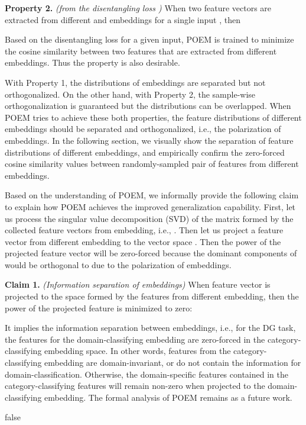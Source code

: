 \documentclass[letterpaper]{article} \usepackage{aaai23}  \usepackage{times}  \usepackage{helvet}  \usepackage{courier}  \usepackage[hyphens]{url}  \usepackage{graphicx} \urlstyle{rm} \def\UrlFont{\rm}  \usepackage{natbib}  \usepackage{caption} \frenchspacing  \setlength{\pdfpagewidth}{8.5in}  \setlength{\pdfpageheight}{11in}  \usepackage[labelsep=period]{caption}
\begin{document}
\textbf{Property 2.} \textit{(from the disentangling loss )} When two feature vectors are extracted from different   and  embeddings for a single input , then


Based on the disentangling loss for a given input, POEM is trained to minimize the cosine similarity between two features that are extracted from different embeddings. Thus the property is also desirable. 

With Property 1, the distributions of embeddings are separated but not orthogonalized. On the other hand, with Property 2, the sample-wise orthogonalization is guaranteed but the distributions can be overlapped.
When POEM tries to achieve these both properties, the feature distributions of different embeddings should be separated and orthogonalized, i.e., the polarization of embeddings.
In the following section, we visually show the separation of feature distributions of different embeddings, and empirically confirm the zero-forced cosine similarity values between randomly-sampled pair of features from different embeddings. 

Based on the understanding of POEM, we informally provide the following claim to explain how POEM achieves the improved generalization capability. 
First, let us process the singular value decomposition (SVD) of the matrix  formed by the collected feature vectors from  embedding, i.e., . Then let us project a feature vector  from different  embedding to the vector space .
Then the power of the projected feature vector will be zero-forced because the dominant components of  would be orthogonal to  due to the polarization of embeddings.

\textbf{Claim 1.} \textit{(Information separation of embeddings)} When feature vector  is projected to the space formed by the features from different  embedding, then the power of the projected feature is minimized to zero:


It implies the information separation between embeddings, i.e., for the DG task, the features for the domain-classifying embedding are zero-forced in the category-classifying embedding space.
In other words,  features from the category-classifying embedding are domain-invariant, or do not contain the information for domain-classification. Otherwise, the domain-specific features contained in the category-classifying features will remain non-zero when projected to the domain-classifying embedding. 
The formal analysis of POEM remains as a future work.

\if false
\end{document}
